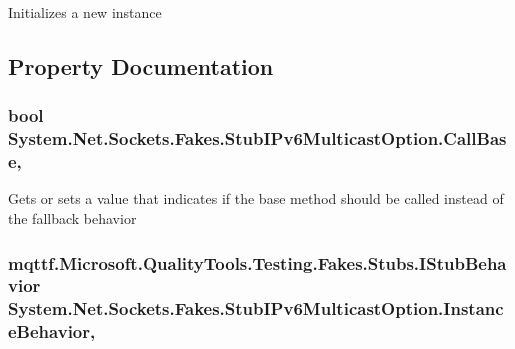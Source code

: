 Initializes a new instance



\subsection{Property Documentation}
\hypertarget{class_system_1_1_net_1_1_sockets_1_1_fakes_1_1_stub_i_pv6_multicast_option_aa55aee0cd6eb7edafc01fefbf5d7a20d}{
\subsubsection[{Call\-Base}]{\setlength{\rightskip}{0pt plus 5cm}bool System.\-Net.\-Sockets.\-Fakes.\-Stub\-I\-Pv6\-Multicast\-Option.\-Call\-Base\hspace{0.3cm}{\ttfamily [get]}, {\ttfamily [set]}}}\label{class_system_1_1_net_1_1_sockets_1_1_fakes_1_1_stub_i_pv6_multicast_option_aa55aee0cd6eb7edafc01fefbf5d7a20d}


Gets or sets a value that indicates if the base method should be called instead of the fallback behavior

\hypertarget{class_system_1_1_net_1_1_sockets_1_1_fakes_1_1_stub_i_pv6_multicast_option_ae32bb636f032bbd4ab8a4889117d911e}{
\subsubsection[{Instance\-Behavior}]{\setlength{\rightskip}{0pt plus 5cm}mqttf.\-Microsoft.\-Quality\-Tools.\-Testing.\-Fakes.\-Stubs.\-I\-Stub\-Behavior System.\-Net.\-Sockets.\-Fakes.\-Stub\-I\-Pv6\-Multicast\-Option.\-Instance\-Behavior\hspace{0.3cm}{\ttfamily [get]}, {\ttfamily [set]}}}\label{class_system_1_1_net_1_1_sockets_1_1_fakes_1_1_stub_i_pv6_multicast_option_ae32bb636f032bbd4ab8a4889117d911e}


